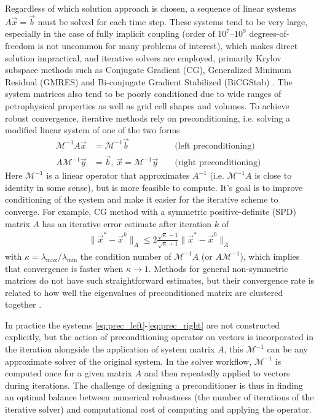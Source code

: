Regardless of which solution approach is chosen, a sequence of linear systems $A \vec{x} = \vec{b}$ must be solved for each time step.   These systems tend to be very large, especially in the case of fully implicit coupling (order of $10^7$--$10^9$ degrees-of-freedom is not uncommon for many problems of interest), which makes direct solution impractical, and iterative solvers are employed, primarily Krylov subspace methods such as Conjugate Gradient (CG), Generalized Minimum Residual (GMRES) and Bi-conjugate Gradient Stabilized (BiCGStab) \cite{Saad2003}.   The system matrices also tend to be poorly conditioned due to wide ranges of petrophysical properties as well as grid cell shapes and volumes.   To achieve robust convergence, iterative methods rely on preconditioning, i.e. solving a modified linear system of one of the two forms
\begin{align}
    \mathcal{M}^{-1}A \vec{x} &= \mathcal{M}^{-1}\vec{b} & & \mbox{ (left preconditioning) } \label{eq:prec_left} \\
    A \mathcal{M}^{-1} \vec{y} &= \vec{b}, \: \vec{x} = \mathcal{M}^{-1} \vec{y} & & \mbox{ (right preconditioning) } \label{eq:prec_right}
\end{align}
Here $\mathcal{M}^{-1}$ is a linear operator that approximates $A^{-1}$ (i.e. $\mathcal{M}^{-1}A$ is close to identity in some sense), but is more feasible to compute.   It's goal is to improve conditioning of the system and make it easier for the iterative scheme to converge.   For example, CG method with a symmetric positive-definite (SPD) matrix $A$ has an iterative error estimate after iteration $k$ of
\begin{align}
    \|\vec{x}^* - \vec{x}^k\|_A \leq 2\frac{\sqrt{\kappa} - 1}{\sqrt{\kappa} + 1} \|\vec{x}^* - \vec{x}^0\|_A
\end{align}
with $\kappa = \lambda_{\max}/\lambda_{\min}$ the condition number of $\mathcal{M}^{-1}A$ (or $A\mathcal{M}^{-1}$), which implies that convergence is faster when $\kappa \to 1$.   Methods for general non-symmetric matrices do not have such straightforward estimates, but their convergence rate is related to how well the eigenvalues of preconditioned matrix are clustered together \cite{Saad2003}.

In practice the systems \eqref{eq:prec_left}-\eqref{eq:prec_right} are not constructed explicitly, but the action of preconditioning operator on vectors is incorporated in the iteration alongside the application of system matrix $A$, this $\mathcal{M}^{-1}$ can be any approximate solver of the original system.   In the solver workflow, $\mathcal{M}^{-1}$ is computed once for a given matrix $A$ and then repeatedly applied to vectors during iterations.   The challenge of designing a preconditioner is thus in finding an optimal balance between numerical robustness (the number of iterations of the iterative solver) and computational cost of computing and applying the operator.

